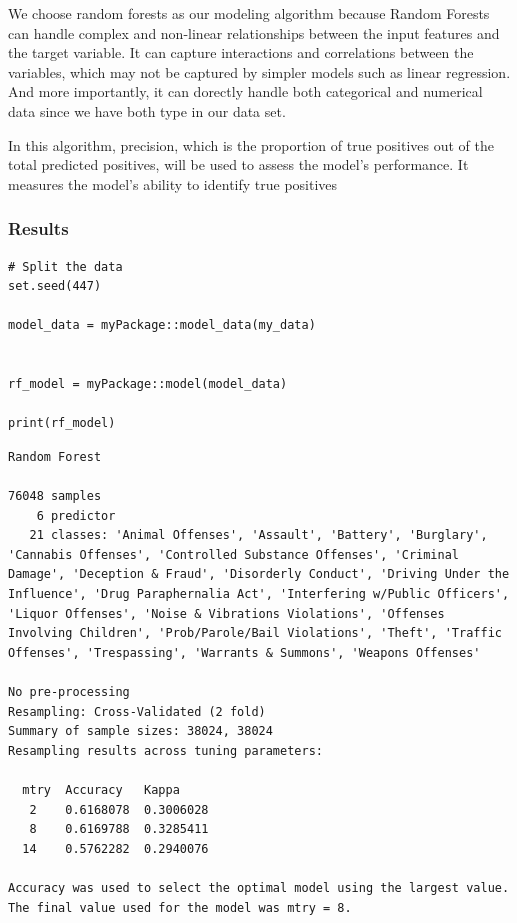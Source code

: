 \documentclass[
  article]{jss}
\begin{document}
We choose random forests as our modeling algorithm because Random
Forests can handle complex and non-linear relationships between the
input features and the target variable. It can capture interactions and
correlations between the variables, which may not be captured by simpler
models such as linear regression. And more importantly, it can dorectly
handle both categorical and numerical data since we have both type in
our data set.

In this algorithm, precision, which is the proportion of true positives
out of the total predicted positives, will be used to assess the model's
performance. It measures the model's ability to identify true positives

\hypertarget{results}{%
\subsubsection{Results}\label{results}}

\begin{verbatim}
# Split the data
set.seed(447)

model_data = myPackage::model_data(my_data)


rf_model = myPackage::model(model_data)

print(rf_model)
\end{verbatim}

\begin{verbatim}
Random Forest 

76048 samples
    6 predictor
   21 classes: 'Animal Offenses', 'Assault', 'Battery', 'Burglary', 'Cannabis Offenses', 'Controlled Substance Offenses', 'Criminal Damage', 'Deception & Fraud', 'Disorderly Conduct', 'Driving Under the Influence', 'Drug Paraphernalia Act', 'Interfering w/Public Officers', 'Liquor Offenses', 'Noise & Vibrations Violations', 'Offenses Involving Children', 'Prob/Parole/Bail Violations', 'Theft', 'Traffic Offenses', 'Trespassing', 'Warrants & Summons', 'Weapons Offenses' 

No pre-processing
Resampling: Cross-Validated (2 fold) 
Summary of sample sizes: 38024, 38024 
Resampling results across tuning parameters:

  mtry  Accuracy   Kappa    
   2    0.6168078  0.3006028
   8    0.6169788  0.3285411
  14    0.5762282  0.2940076

Accuracy was used to select the optimal model using the largest value.
The final value used for the model was mtry = 8.
\end{verbatim}
\end{document}
